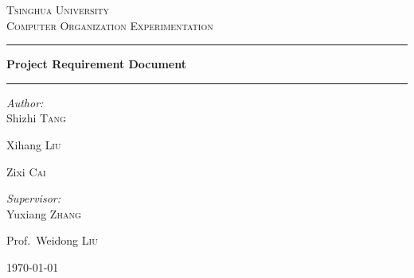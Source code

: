 \documentclass[11pt,utf8]{article}
\begin{document}
\newcommand{\hlink}[1]{
	\footnote{\href{#1}{\textsl{\underline{#1}}}}
}
\renewenvironment{proof}{\noindent{\textbf{证明：}}}{\hfill $\square$ \vskip 4mm}
\newtheorem*{theorem*}{定理}
\newcommand{\theorem}[1]{
	\begin{theorem*}\textup{#1}\end{theorem*}
}
\let\enumerate\compactenum
\let\endenumerate\endcompactenum
\let\itemize\compactitem
\let\enditemize\endcompactitem
\setlength{\pltopsep}{5pt}
\setlength{\parindent}{2em}
\setlength{\footskip}{30pt}
\setlength{\baselineskip}{1.3\baselineskip}
\renewcommand\arraystretch{1.2}


\begin{titlepage}
\fancyhead[CH]{}

\hspace{3.0cm}
\begin{center}
\vfill

\textsc{\LARGE Tsinghua University}\\[0.8cm]

\textsc{\Large Computer Organization Experimentation}\\[2.5cm]


\rule[0.75\baselineskip]{0.75\textwidth}{1pt}

{ \huge \bfseries Project Requirement Document}\\[0.4cm]

\rule[15\baselineskip]{0.75\textwidth}{1pt}

\begin{minipage}{0.4\textwidth}
\begin{flushleft} \large
\emph{Author:}\\
Shizhi \textsc{Tang}

Xihang \textsc{Liu}

Zixi \textsc{Cai}
\end{flushleft}
\end{minipage}
\begin{minipage}{0.4\textwidth}
\begin{flushright} \large
\emph{Supervisor:} \\
Yuxiang \textsc{Zhang}

Prof.~Weidong \textsc{Liu}
\end{flushright}
\end{minipage}

\vfill
\vspace{3.0cm}
{\large \today}

\end{center}

\end{titlepage}
\renewcommand{\headrulewidth}{0.4pt}
\setcounter{page}{2}
\tableofcontents
\newpage
\end{document}
